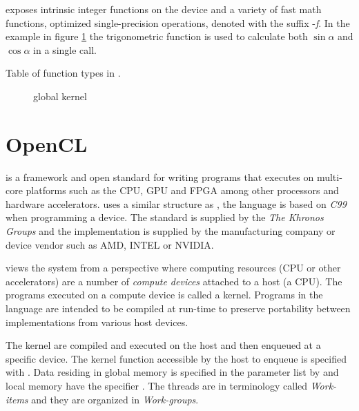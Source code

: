 {\CU} exposes intrinsic integer functions on the device and a variety of fast math functions, optimized single-precision operations, denoted with the suffix -\emph{f}. In the {\CU} example in figure \ref{lst:sample:global:cu} the trigonometric function  is used to calculate both $\sin{\alpha}$ and $\cos{\alpha}$ in a single call.

\begin{table}
	\centering
	
	\caption{Table of function types in {\CU}.}
	\label{tab:cuda:func-types}
\end{table}

\begin{figure}
	\centering
	\fbox{}
	\caption{{\CU} global kernel}
	\label{lst:sample:global:cu}	
\end{figure}

\section{OpenCL}

{\OCL} is a framework and open standard for writing programs that executes on multi-core platforms such as the \gls{CPU}, \gls{GPU} and \gls{FPGA} among other processors and hardware accelerators. {\OCL} uses a similar structure as {\CU}, the language is based on \emph{C99} when programming a device. The standard is supplied by the \emph{The Khronos Groups} and the implementation is supplied by the manufacturing company or device vendor such as AMD, INTEL or NVIDIA.

{\OCL} views the system from a perspective where computing resources (\gls{CPU} or other accelerators) are a number of \emph{compute devices} attached to a host (a \gls{CPU}). The programs executed on a compute device is called a kernel. Programs in the {\OCL} language are intended to be compiled at run-time to preserve portability between implementations from various host devices.

The {\OCL} kernel are compiled and executed on the host and then enqueued at a specific device. The kernel function accessible by the host to enqueue is specified with . Data residing in global memory is specified in the parameter list by  and local memory have the specifier . The {\CU} threads are in {\OCL} terminology called \emph{Work-items} and they are organized in \emph{Work-groups}.

